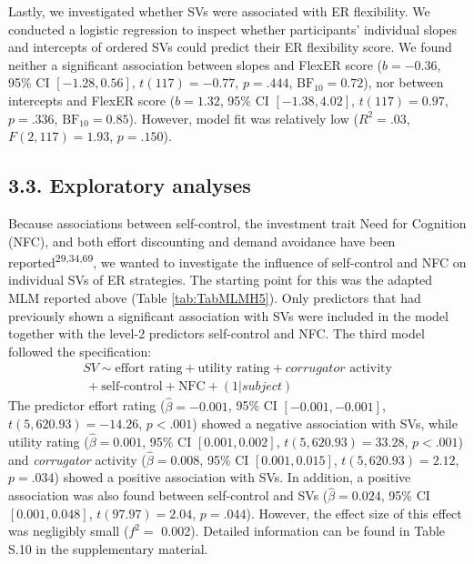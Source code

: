\documentclass[
  man,floatsintext]{apa6}
\begin{document}
Lastly, we investigated whether SVs were associated with ER flexibility.
We conducted a logistic regression to inspect whether participants' individual slopes and intercepts of ordered SVs could predict their ER flexibility score.
We found neither a significant association between slopes and FlexER score (\(b = -0.36\), 95\% CI \([-1.28, 0.56]\), \(t(117) = -0.77\), \(p = .444\), \(\mathrm{BF}_{\textrm{10}} = 0.72\)), nor between intercepts and FlexER score (\(b = 1.32\), 95\% CI \([-1.38, 4.02]\), \(t(117) = 0.97\), \(p = .336\), \(\mathrm{BF}_{\textrm{10}} = 0.85\)).
However, model fit was relatively low (\(R^2 = .03\), \(F(2, 117) = 1.93\), \(p = .150\)).

\hypertarget{exploratory-analyses}{%
\subsection{3.3. Exploratory analyses}\label{exploratory-analyses}}

Because associations between self-control, the investment trait Need for Cognition (NFC), and both effort discounting and demand avoidance have been reported\textsuperscript{29,34,69}, we wanted to investigate the influence of self-control and NFC on individual SVs of ER strategies.
The starting point for this was the adapted MLM reported above (Table \ref{tab:TabMLMH5}).
Only predictors that had previously shown a significant association with SVs were included in the model together with the level-2 predictors self-control and NFC.
The third model followed the specification:
\[
\begin{split}
SV \sim \text{effort rating} + \text{utility rating} + corrugator \text{ activity} \\\ + \text{self-control} + \text{NFC} + (1 |subject)
\end{split}
\]
The predictor effort rating (\(\hat{\beta} = -0.001\), 95\% CI \([-0.001, -0.001]\), \(t(5,620.93) = -14.26\), \(p < .001\)) showed a negative association with SVs, while utility rating (\(\hat{\beta} = 0.001\), 95\% CI \([0.001, 0.002]\), \(t(5,620.93) = 33.28\), \(p < .001\)) and \emph{corrugator} activity (\(\hat{\beta} = 0.008\), 95\% CI \([0.001, 0.015]\), \(t(5,620.93) = 2.12\), \(p = .034\)) showed a positive association with SVs.
In addition, a positive association was also found between self-control and SVs (\(\hat{\beta} = 0.024\), 95\% CI \([0.001, 0.048]\), \(t(97.97) = 2.04\), \(p = .044\)).
However, the effect size of this effect was negligibly small (\(f^{2}=\) 0.002).
Detailed information can be found in Table S.10 in the supplementary material.
\end{document}
